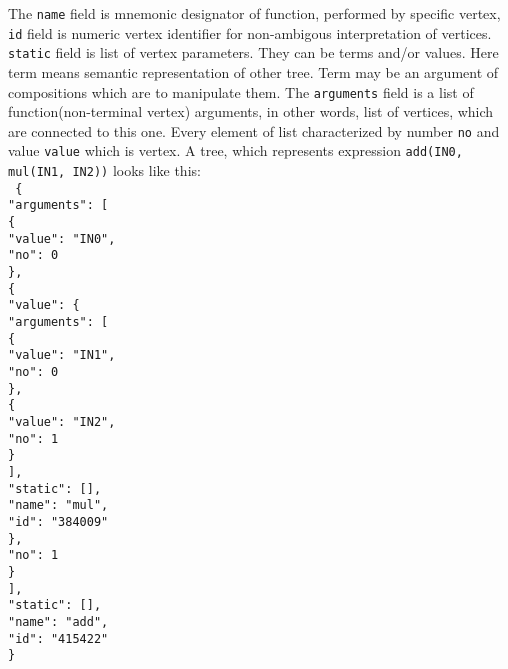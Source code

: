 The \texttt{name} field is mnemonic designator of function, performed by specific vertex, \texttt{id} field is numeric vertex identifier for non-ambigous interpretation of vertices. \texttt{static} field is list of vertex parameters. They can be terms and/or values. Here term means semantic representation of other tree. Term may be an argument of compositions which are to manipulate them. The \texttt{arguments} field is a list of function(non-terminal vertex) arguments, in other words, list of vertices, which are connected to this one. Every element of list characterized by number \texttt{no} and value \texttt{value} which is vertex. A tree, which represents expression \texttt{add(IN0, mul(IN1, IN2))} looks like this:\\
\texttt{
\{\\
\indent "arguments": [\\
\indent \indent \{\\
\indent \indent \indent "value": "IN0",\\
\indent \indent \indent "no": 0\\
\indent \indent \},\\
\indent \indent \{\\
\indent \indent \indent "value": \{\\
\indent \indent \indent \indent "arguments": [\\
\indent \indent \indent \indent \indent \{\\
\indent \indent \indent \indent \indent \indent "value": "IN1",\\
\indent \indent \indent \indent \indent \indent "no": 0\\
\indent \indent \indent \indent \indent \},\\
\indent \indent \indent \indent \indent \{\\
\indent \indent \indent \indent \indent \indent "value": "IN2",\\
\indent \indent \indent \indent \indent \indent "no": 1\\
\indent \indent \indent \indent \indent \}\\
\indent \indent \indent \indent ],\\
\indent \indent \indent \indent "static": [],\\
\indent \indent \indent \indent "name": "mul",\\
\indent \indent \indent \indent "id": "384009"\\
\indent \indent \indent \},\\
\indent \indent \indent "no": 1\\
\indent \indent \}\\
\indent ],\\
\indent "static": [],\\
\indent "name": "add",\\
\indent "id": "415422"\\
\}
}

